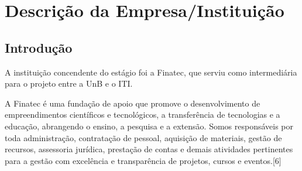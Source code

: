 \chapter[Descrição da Empresa/Instituição]{Descrição da Empresa/Instituição}


\section{Introdução}

A instituição concendente do estágio foi a Finatec, que serviu como intermediária para o projeto entre a UnB e o ITI.

A Finatec é uma fundação de apoio que promove o desenvolvimento de empreendimentos científicos e tecnológicos,
a transferência de tecnologias e a educação, abrangendo o ensino, a pesquisa e a extensão. Somos responsáveis por toda administração,
contratação de pessoal, aquisição de materiais, gestão de recursos, assessoria jurídica, prestação de
contas e demais atividades pertinentes para a gestão com excelência e transparência de projetos, cursos e eventos.[6]
